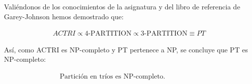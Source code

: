 \documentclass{article}
\begin{document}
Valiéndonos de los conocimientos de la asignatura y del libro de referencia de Garey-Johnson hemos demostrado que:

\vspace{1\baselineskip}
$ \quad \quad \quad \quad \quad \quad \quad ACTRI
\propto 
4\text{-PARTITION}
\propto
3\text{-PARTITION}
\equiv
PT$

\vspace{1\baselineskip}
Así, como ACTRI es NP-completo y PT pertenece a NP, se concluye que PT es NP-completo:

\vspace{1\baselineskip}
$ \quad \quad \quad \quad \quad \quad \quad \quad \boxed{\text{Partición en tríos es NP-completo}.}$
\end{document}
